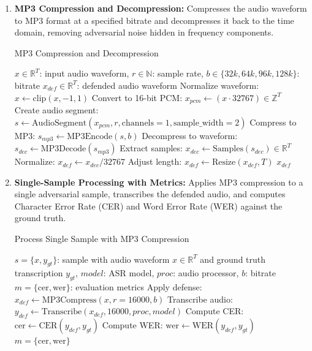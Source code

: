 \documentclass[../main.tex]{subfiles}
\begin{document}
\begin{enumerate}
    \item \textbf{MP3 Compression and Decompression:} Compresses the audio waveform to MP3 format at a specified bitrate and decompresses it back to the time domain, removing adversarial noise hidden in frequency components.

    \begin{breakablealgorithm}{MP3 Compression and Decompression}
    \begin{algorithmic}[1]
    \Require $x \in \mathbb{R}^T$: input audio waveform, $r \in \mathbb{N}$: sample rate, $b \in \{32k, 64k, 96k, 128k\}$: bitrate
    \Ensure $x_{def} \in \mathbb{R}^T$: defended audio waveform
    \State Normalize waveform: $x \gets \text{clip}(x, -1, 1)$ 
    \State Convert to 16-bit PCM: $x_{pcm} \gets (x \cdot 32767) \in \mathbb{Z}^T$ 
    \State Create audio segment: $s \gets \text{AudioSegment}(x_{pcm}, r, \text{channels}=1, \text{sample\_width}=2)$ 
    \State Compress to MP3: $s_{mp3} \gets \text{MP3Encode}(s, b)$ 
    \State Decompress to waveform: $s_{dec} \gets \text{MP3Decode}(s_{mp3})$ 
    \State Extract samples: $x_{dec} \gets \text{Samples}(s_{dec}) \in \mathbb{R}^T$ 
    \State Normalize: $x_{def} \gets x_{dec} / 32767$ 
    \State Adjust length: $x_{def} \gets \text{Resize}(x_{def}, T)$ 
    \State \Return $x_{def}$ 
    \end{algorithmic}
    \end{breakablealgorithm}

    \item \textbf{Single-Sample Processing with Metrics:} Applies MP3 compression to a single adversarial sample, transcribes the defended audio, and computes Character Error Rate (CER) and Word Error Rate (WER) against the ground truth.

    \begin{breakablealgorithm}{Process Single Sample with MP3 Compression}
    \begin{algorithmic}[1]
    \Require $s = \{x, y_{gt}\}$: sample with audio waveform $x \in \mathbb{R}^T$ and ground truth transcription $y_{gt}$, $model$: ASR model, $proc$: audio processor, $b$: bitrate
    \Ensure $m = \{\text{cer}, \text{wer}\}$: evaluation metrics
    \State Apply defense: $x_{def} \gets \text{MP3Compress}(x, r=16000, b)$ 
    \State Transcribe audio: $y_{def} \gets \text{Transcribe}(x_{def}, 16000, proc, model)$ 
    \State Compute CER: $\text{cer} \gets \text{CER}(y_{def}, y_{gt})$ 
    \State Compute WER: $\text{wer} \gets \text{WER}(y_{def}, y_{gt})$ 
    \State \Return $m = \{\text{cer}, \text{wer}\}$ 
    \end{algorithmic}
    \end{breakablealgorithm}
\end{enumerate}
\end{document}
